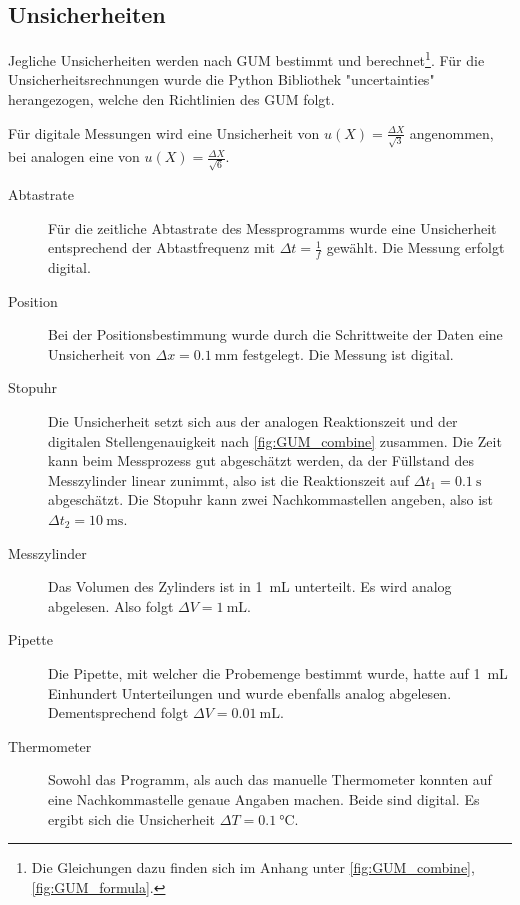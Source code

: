 	\subsection{Unsicherheiten}
	
		Jegliche Unsicherheiten werden nach GUM bestimmt und berechnet\footnote{Die Gleichungen dazu finden sich im Anhang unter \ref{fig:GUM_combine}, \ref{fig:GUM_formula}.}.
		Für die Unsicherheitsrechnungen wurde die Python Bibliothek "uncertainties" herangezogen, welche den Richtlinien des GUM folgt.
	
		Für digitale Messungen wird eine Unsicherheit von $u(X) = \frac{\Delta X}{\sqrt{3}}$ angenommen, bei analogen eine von $u(X) = \frac{\Delta X}{\sqrt{6}}$.
		
		\begin{description}
			\item[Abtastrate] Für die zeitliche Abtastrate des Messprogramms wurde eine Unsicherheit entsprechend der Abtastfrequenz mit $\Delta t = \frac{1}{f}$ gewählt.
			Die Messung erfolgt digital.
			
			\item[Position] Bei der Positionsbestimmung wurde durch die Schrittweite der Daten eine Unsicherheit von $\Delta x = \SI{0.1}{\milli\meter}$ festgelegt.
			Die Messung ist digital.
			
			\item[Stopuhr] Die Unsicherheit setzt sich aus der analogen Reaktionszeit und der digitalen Stellengenauigkeit nach \ref{fig:GUM_combine} zusammen.
			Die Zeit kann beim Messprozess gut abgeschätzt werden, da der Füllstand des Messzylinder linear zunimmt, also ist die Reaktionszeit auf $\Delta t_1 = \SI{0.1}{\second}$ abgeschätzt.
			Die Stopuhr kann zwei Nachkommastellen angeben, also ist $\Delta t_2 = \SI{10}{\milli\second}$.
			
			\item[Messzylinder] Das Volumen des Zylinders ist in \SI{1}{\milli\liter} unterteilt.
			Es wird analog abgelesen.
			Also folgt $\Delta V = \SI{1}{\milli\liter}$.
			
			\item[Pipette] Die Pipette, mit welcher die Probemenge bestimmt wurde, hatte auf \SI{1}{\milli\liter} Einhundert Unterteilungen und wurde ebenfalls analog abgelesen.
			Dementsprechend folgt $\Delta V = \SI{0.01}{\milli\liter}$.
			
			\item[Thermometer] Sowohl das Programm, als auch das manuelle Thermometer konnten auf eine Nachkommastelle genaue Angaben machen.
			Beide sind digital.
			Es ergibt sich die Unsicherheit $\Delta T = \SI{0.1}{\celsius}$.
		\end{description}
		
